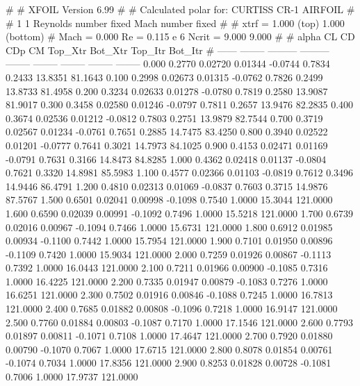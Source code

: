 #  
#       XFOIL         Version 6.99
#  
# Calculated polar for: CURTISS CR-1 AIRFOIL                            
#  
# 1 1 Reynolds number fixed          Mach number fixed         
#  
# xtrf =   1.000 (top)        1.000 (bottom)  
# Mach =   0.000     Re =     0.115 e 6     Ncrit =   9.000  9.000
#  
#   alpha    CL        CD       CDp       CM     Top_Xtr  Bot_Xtr  Top_Itr  Bot_Itr
#  ------ -------- --------- --------- -------- -------- -------- -------- --------
   0.000   0.2770   0.02720   0.01344  -0.0744   0.7834   0.2433  13.8351  81.1643
   0.100   0.2998   0.02673   0.01315  -0.0762   0.7826   0.2499  13.8733  81.4958
   0.200   0.3234   0.02633   0.01278  -0.0780   0.7819   0.2580  13.9087  81.9017
   0.300   0.3458   0.02580   0.01246  -0.0797   0.7811   0.2657  13.9476  82.2835
   0.400   0.3674   0.02536   0.01212  -0.0812   0.7803   0.2751  13.9879  82.7544
   0.700   0.3719   0.02567   0.01234  -0.0761   0.7651   0.2885  14.7475  83.4250
   0.800   0.3940   0.02522   0.01201  -0.0777   0.7641   0.3021  14.7973  84.1025
   0.900   0.4153   0.02471   0.01169  -0.0791   0.7631   0.3166  14.8473  84.8285
   1.000   0.4362   0.02418   0.01137  -0.0804   0.7621   0.3320  14.8981  85.5983
   1.100   0.4577   0.02366   0.01103  -0.0819   0.7612   0.3496  14.9446  86.4791
   1.200   0.4810   0.02313   0.01069  -0.0837   0.7603   0.3715  14.9876  87.5767
   1.500   0.6501   0.02041   0.00998  -0.1098   0.7540   1.0000  15.3044 121.0000
   1.600   0.6590   0.02039   0.00991  -0.1092   0.7496   1.0000  15.5218 121.0000
   1.700   0.6739   0.02016   0.00967  -0.1094   0.7466   1.0000  15.6731 121.0000
   1.800   0.6912   0.01985   0.00934  -0.1100   0.7442   1.0000  15.7954 121.0000
   1.900   0.7101   0.01950   0.00896  -0.1109   0.7420   1.0000  15.9034 121.0000
   2.000   0.7259   0.01926   0.00867  -0.1113   0.7392   1.0000  16.0443 121.0000
   2.100   0.7211   0.01966   0.00900  -0.1085   0.7316   1.0000  16.4225 121.0000
   2.200   0.7335   0.01947   0.00879  -0.1083   0.7276   1.0000  16.6251 121.0000
   2.300   0.7502   0.01916   0.00846  -0.1088   0.7245   1.0000  16.7813 121.0000
   2.400   0.7685   0.01882   0.00808  -0.1096   0.7218   1.0000  16.9147 121.0000
   2.500   0.7760   0.01884   0.00803  -0.1087   0.7170   1.0000  17.1546 121.0000
   2.600   0.7793   0.01897   0.00811  -0.1071   0.7108   1.0000  17.4647 121.0000
   2.700   0.7920   0.01880   0.00790  -0.1070   0.7067   1.0000  17.6715 121.0000
   2.800   0.8078   0.01854   0.00761  -0.1074   0.7034   1.0000  17.8356 121.0000
   2.900   0.8253   0.01828   0.00728  -0.1081   0.7006   1.0000  17.9737 121.0000
